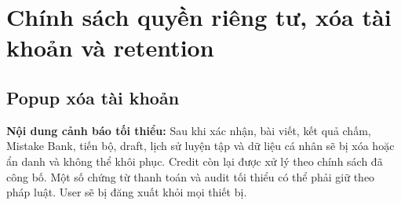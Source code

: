 \documentclass[11pt,a4paper]{article}
\begin{document}
\section{Chính sách quyền riêng tư, xóa tài khoản và retention}
\subsection{Popup xóa tài khoản}
\begin{warningbox}
\textbf{Nội dung cảnh báo tối thiểu:} Sau khi xác nhận, bài viết, kết quả chấm, Mistake Bank, tiến bộ, draft, lịch sử luyện tập và dữ liệu cá nhân sẽ bị xóa hoặc ẩn danh và không thể khôi phục. Credit còn lại được xử lý theo chính sách đã công bố. Một số chứng từ thanh toán và audit tối thiểu có thể phải giữ theo pháp luật. User sẽ bị đăng xuất khỏi mọi thiết bị.
\end{warningbox}
\end{document}
